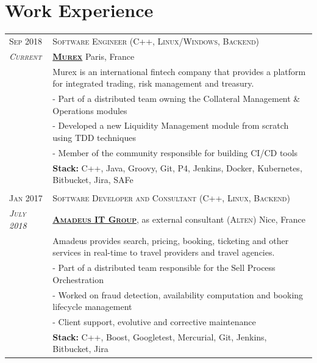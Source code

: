 \documentclass[a4paper,10pt]{article}
\begin{document}
   \vspace{-2mm}

   \section{Work Experience}
   \begin{tabular}{p{1.7cm}|p{15.5cm}}
      \centering\textsc{Sep 2018} &
      \textsc{Software Engineer (C++, Linux/Windows, Backend)}\\
      \centering\emph{\textsc{Current}} &
      \textsc{\textbf{\href{https://www.murex.com/}{Murex}}} \hfill Paris, France\\
      & Murex is an international fintech company that provides a platform for integrated trading, risk management and treasury.\\
      & - Part of a distributed team owning the Collateral Management \& Operations modules\\
      & - Developed a new Liquidity Management module from scratch using TDD techniques\\
      & - Member of the community responsible for building CI/CD tools\\
      & \textbf{Stack:} C++, Java, Groovy, Git, P4, Jenkins, Docker, Kubernetes, Bitbucket, Jira, SAFe\\
      
      \multicolumn{2}{c}{} \\
      \centering\textsc{Jan 2017} &
      \textsc{Software Developer and Consultant (C++, Linux, Backend)} \\
      \centering\emph{\textsc{July 2018}} &
      \textsc{\textbf{\href{http://www.amadeus.com/}{Amadeus IT Group}}}, as external consultant (\textsc{Alten}) \hfill Nice, France\\
      & Amadeus provides search, pricing, booking, ticketing and other services in real-time to travel providers and travel agencies.\\
      & - Part of a distributed team responsible for the Sell Process Orchestration\\
      & - Worked on fraud detection, availability computation and booking lifecycle management\\
      & - Client support, evolutive and corrective maintenance\\
      & \textbf{Stack:} C++, Boost, Googletest, Mercurial, Git, Jenkins, Bitbucket, Jira\\


\end{tabular}
\end{document}
